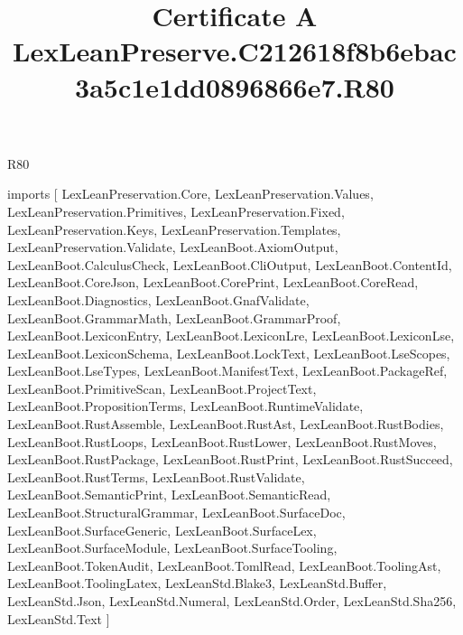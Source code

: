 \begin{lexlean}{R80}
\title{Certificate A LexLeanPreserve.C212618f8b6ebac3a5c1e1dd0896866e7.R80}
\begin{coremodule}
imports [
  LexLeanPreservation.Core,
  LexLeanPreservation.Values,
  LexLeanPreservation.Primitives,
  LexLeanPreservation.Fixed,
  LexLeanPreservation.Keys,
  LexLeanPreservation.Templates,
  LexLeanPreservation.Validate,
  LexLeanBoot.AxiomOutput,
  LexLeanBoot.CalculusCheck,
  LexLeanBoot.CliOutput,
  LexLeanBoot.ContentId,
  LexLeanBoot.CoreJson,
  LexLeanBoot.CorePrint,
  LexLeanBoot.CoreRead,
  LexLeanBoot.Diagnostics,
  LexLeanBoot.GnafValidate,
  LexLeanBoot.GrammarMath,
  LexLeanBoot.GrammarProof,
  LexLeanBoot.LexiconEntry,
  LexLeanBoot.LexiconLre,
  LexLeanBoot.LexiconLse,
  LexLeanBoot.LexiconSchema,
  LexLeanBoot.LockText,
  LexLeanBoot.LseScopes,
  LexLeanBoot.LseTypes,
  LexLeanBoot.ManifestText,
  LexLeanBoot.PackageRef,
  LexLeanBoot.PrimitiveScan,
  LexLeanBoot.ProjectText,
  LexLeanBoot.PropositionTerms,
  LexLeanBoot.RuntimeValidate,
  LexLeanBoot.RustAssemble,
  LexLeanBoot.RustAst,
  LexLeanBoot.RustBodies,
  LexLeanBoot.RustLoops,
  LexLeanBoot.RustLower,
  LexLeanBoot.RustMoves,
  LexLeanBoot.RustPackage,
  LexLeanBoot.RustPrint,
  LexLeanBoot.RustSucceed,
  LexLeanBoot.RustTerms,
  LexLeanBoot.RustValidate,
  LexLeanBoot.SemanticPrint,
  LexLeanBoot.SemanticRead,
  LexLeanBoot.StructuralGrammar,
  LexLeanBoot.SurfaceDoc,
  LexLeanBoot.SurfaceGeneric,
  LexLeanBoot.SurfaceLex,
  LexLeanBoot.SurfaceModule,
  LexLeanBoot.SurfaceTooling,
  LexLeanBoot.TokenAudit,
  LexLeanBoot.TomlRead,
  LexLeanBoot.ToolingAst,
  LexLeanBoot.ToolingLatex,
  LexLeanStd.Blake3,
  LexLeanStd.Buffer,
  LexLeanStd.Json,
  LexLeanStd.Numeral,
  LexLeanStd.Order,
  LexLeanStd.Sha256,
  LexLeanStd.Text
]


\end{coremodule}
\end{lexlean}

